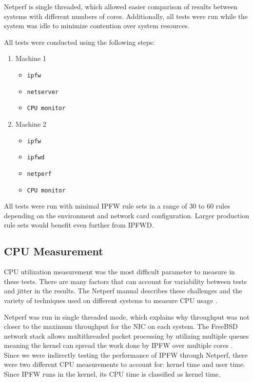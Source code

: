 \documentclass[journal]{IEEEtran}
\begin{document}
    Netperf is single threaded, which allowed easier comparison of results
    between systems with different numbers of cores. Additionally, all tests
    were run while the system was idle to minimize contention over system
    resources. 

    All tests were conducted using the following steps:
    \begin{enumerate}
        \item Machine 1
        \begin{itemize}
          \item \texttt{ipfw}
          \item \texttt{netserver}
          \item \texttt{CPU monitor}
        \end{itemize}
        \item Machine 2
        \begin{itemize}
          \item \texttt{ipfw}
          \item \texttt{ipfwd}
          \item \texttt{netperf}
          \item \texttt{CPU monitor}
        \end{itemize}
    \end{enumerate}

    All tests were run with minimal IPFW rule sets in a range of 30 to 60 rules
    depending on the environment and network card configuration. Larger
    production rule sets would benefit even further from IPFWD.

  \subsection{CPU Measurement}

    CPU utilization measurement was the most difficult parameter to measure in
    these tests. There are many factors that can account for variability
    between tests and jitter in the results. The Netperf manual describes these
    challenges and the variety of techniques used on different systems to
    measure CPU usage \cite{netperf}.

    Netperf was run in single threaded mode, which explains why throughput was
    not closer to the maximum throughput for the NIC on each system. The
    FreeBSD network stack allows multithreaded packet processing by utilizing
    multiple queues meaning the kernel can spread the work done by IPFW over
    multiple cores \cite{freebsdhandbook}. Since we were indirectly testing the
    performance of IPFW through Netperf, there were two different CPU
    measurements to account for: kernel time and user time. Since IPFW runs in
    the kernel, its CPU time is classified as kernel time.
\end{document}
